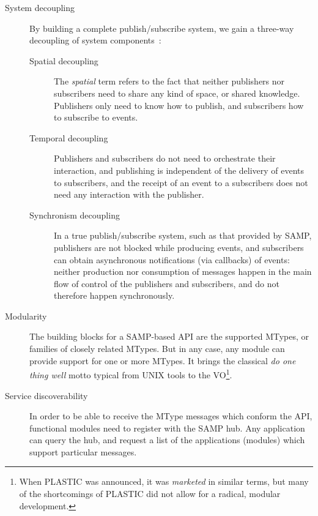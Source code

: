 		\begin{description}
			\item[System decoupling] By building a complete
			publish/subscribe system, we gain a three-way decoupling
			of system components~\cite{857078}:
			\begin{description}
				\item[Spatial decoupling] The \emph{spatial} term
				refers to the fact that neither publishers nor
				subscribers need to share any kind of space, or
				shared knowledge. Publishers only need to know how
				to publish, and subscribers how to subscribe to
				events.
				
				\item[Temporal decoupling] Publishers and
				subscribers do not need to orchestrate their
				interaction, and publishing is independent of
				the delivery of events to subscribers, and the
				receipt of an event to a subscribers does not need
				any interaction with the publisher.
				
				\item[Synchronism decoupling] In a true
				publish/subscribe system, such as that provided by
				SAMP, publishers are not blocked while producing
				events, and subscribers can obtain asynchronous
				notifications (via callbacks) of events: neither
				production nor consumption of messages happen in
				the main flow of control of the publishers and
				subscribers, and do not therefore happen
				synchronously.
			\end{description}
			
			\item[Modularity] The building blocks for a
			SAMP-based API are the supported MTypes, or
			families of closely related MTypes. But in any case,
			any module can provide support for one or more MTypes.
			It brings the classical \emph{do one thing well}
			motto typical from UNIX tools to the
			VO\footnote{When PLASTIC was announced, it was
			\emph{marketed} in similar terms, but many of the
			shortcomings of PLASTIC did not allow for a radical,
			modular development.}.
			
			\item[Service discoverability] In order to be
			able to receive the MType messages which conform the
			API, functional modules need to register with the
			SAMP hub. Any application can query the hub, and
			request a list of the applications (modules) which
			support particular messages. 
			

\end{description}
